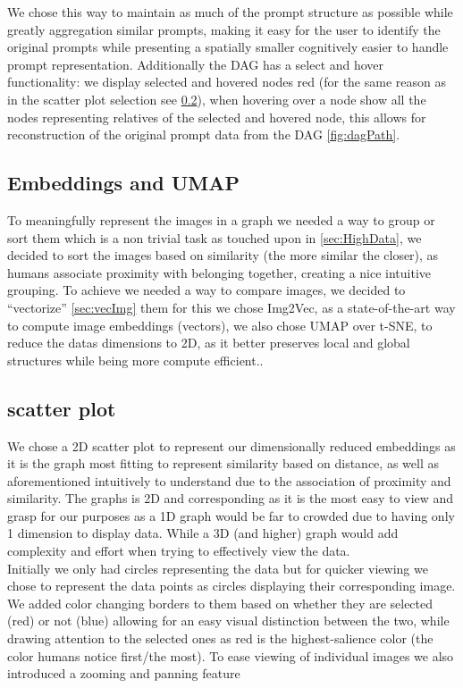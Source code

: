 \documentclass[
  a4paper,  %
  twoside,  %
  bibliography=totoc,
  headsepline,
  cleardoublepage=empty,
  parskip=half,
  draft=false
]{scrbook}
\begin{document}
We chose this way to maintain as much of the prompt structure as possible while greatly aggregation similar prompts, making it easy for the user to identify the original prompts while presenting a spatially smaller cognitively easier to handle prompt representation. Additionally the DAG has a select and hover functionality: we display selected and hovered nodes red (for the same reason as in the scatter plot selection see \cref{sec:scatter}), when hovering over a node show all the nodes representing relatives of the selected and hovered node, this allows for reconstruction of the original prompt data from the DAG \cref{fig:dagPath}.  


\subsection{Embeddings and UMAP}
To meaningfully represent the images in a graph we needed a way to group or sort them which is a non trivial task as touched upon in \cref{sec:HighData}, we decided to sort the images based on similarity (the more similar the closer), as humans associate proximity with belonging together, creating a nice intuitive grouping. To achieve we needed a way to compare images, we decided to \enquote{vectorize} \cref{sec:vecImg} them for this we chose Img2Vec, as a state-of-the-art way to compute image embeddings (vectors), we also chose UMAP over t-SNE, to reduce the datas dimensions to 2D, as it better preserves local and global structures while being more compute efficient..
\subsection{scatter plot}
\label{sec:scatter}
We chose a 2D scatter plot to represent our dimensionally reduced embeddings as it is the graph most fitting to represent similarity based on distance, as well as aforementioned intuitively to understand due to the association of proximity and similarity. The graphs is 2D and corresponding as it is the most easy to view and grasp for our purposes as a 1D graph would be far to crowded due to having only 1 dimension to display data. While a 3D (and higher) graph would add complexity and effort when trying to effectively view the data.\\
Initially we only had circles representing the data but for quicker viewing we chose to represent the data points as circles displaying their corresponding image. We added color changing borders to them based on whether they are selected (red) or not (blue) allowing for an easy visual distinction between the two, while drawing attention to the selected ones as red is the highest-salience color (the color humans notice first/the most). To ease viewing of individual images we also introduced a zooming and panning feature
\end{document}
